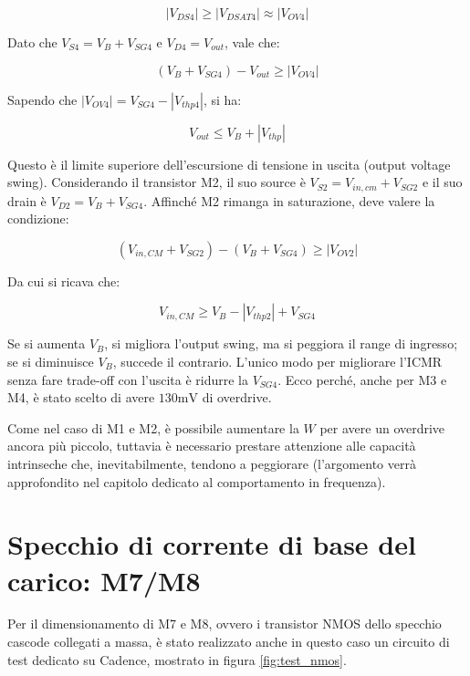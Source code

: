 \documentclass[12pt,a4paper,twoside]{report}
\begin{document}
$$|V_{DS4}| \ge |V_{DSAT4}| \approx |V_{OV4}|$$

\vspace{0.3cm}

\noindent Dato che $V_{S4}=V_B+V_{SG4}$ e $V_{D4}=V_{out}$, vale che:

$$(V_B+V_{SG4})-V_{out}\ge |V_{OV4}|$$

\vspace{0.3cm}

\noindent Sapendo che $|V_{OV4}|=V_{SG4}-|V_{thp4}|$, si ha:

$$V_{out}\le V_B+|V_{thp}|$$

\vspace{0.3cm}

\noindent Questo è il limite superiore dell'escursione di tensione in uscita (output voltage swing). Considerando il transistor M2, il suo source è $V_{S2}=V_{in,cm}+V_{SG2}$ e il suo drain è $V_{D2}=V_B+V_{SG4}$. Affinché M2 rimanga in saturazione, deve valere la condizione:

$$(V_{in,CM}+V_{SG2})-(V_B+V_{SG4})\ge |V_{OV2}|$$

\vspace{0.3cm}

\noindent Da cui si ricava che:

$$V_{in,CM} \ge V_B-|V_{thp2}|+V_{SG4}$$

\vspace{0.4cm}

\noindent Se si aumenta $V_B$, si migliora l'output swing, ma si peggiora il range di ingresso; se si diminuisce $V_B$, succede il contrario. L'unico modo per migliorare l'ICMR senza fare trade-off con l'uscita è ridurre la $V_{SG4}$. Ecco perché, anche per M3 e M4, è stato scelto di avere $130\mathrm{mV}$ di overdrive.

Come nel caso di M1 e M2, è possibile aumentare la $W$ per avere un overdrive ancora più piccolo, tuttavia è necessario prestare attenzione alle capacità intrinseche che, inevitabilmente, tendono a peggiorare (l'argomento verrà approfondito nel capitolo dedicato al comportamento in frequenza).

\section{Specchio di corrente di base del carico: M7/M8}

Per il dimensionamento di M7 e M8, ovvero i transistor NMOS dello specchio cascode collegati a massa, è stato realizzato anche in questo caso un circuito di test dedicato su Cadence, mostrato in figura \ref{fig:test_nmos}.
\end{document}
